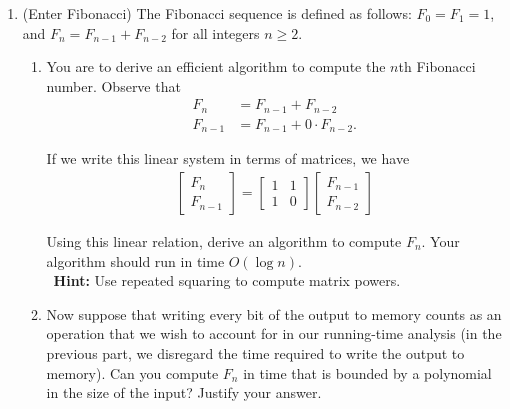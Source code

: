 \documentclass[11pt]{article}
\begin{document}
 \begin{enumerate}
\item (Enter Fibonacci) The Fibonacci sequence is defined as follows: $F_{0} = F_{1} = 1$, and $F_{n} = F_{n-1} + F_{n-2}$ for all integers $n \geq 2$.
  \begin{enumerate}
      \item You are to derive an efficient algorithm to compute the $n$th Fibonacci number. Observe that 
\begin{align*}
  F_{n} & = F_{n-1} + F_{n-2}\\
  F_{n-1} & = F_{n-1} + 0 \cdot F_{n-2}.
\end{align*}

If we write this linear system in terms of matrices, we have
\begin{align*}
  \begin{bmatrix}
    F_{n} \\ 
  F_{n-1}
  \end{bmatrix} =
  \begin{bmatrix}
    1&1\\
    1 & 0
  \end{bmatrix}
\begin{bmatrix}
    F_{n-1} \\ 
  F_{n-2}
\end{bmatrix}
\end{align*}

Using this linear relation, derive an algorithm to compute $F_{n}$. Your algorithm should run in time $O (\log n)$. \\\ \textbf{Hint:} Use repeated squaring to compute matrix powers.
  
  \item Now suppose that writing every bit of the output to memory counts as an operation that we wish to account for in our running-time analysis (in the previous part, we disregard the time required to write the output to memory). Can you compute $F_{n}$ in time that is bounded by a polynomial in the size of the input? Justify your answer.


\end{enumerate}
\end{enumerate}
\end{document}
